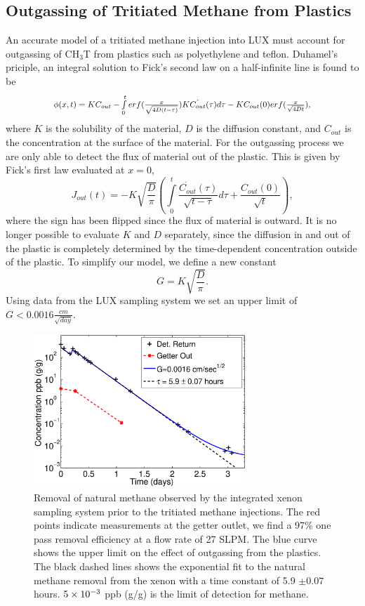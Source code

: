 \subsection{Outgassing of Tritiated Methane from Plastics}

\newcommand*{\Scale}[2][4]{\scalebox{#1}{$#2$}}%

An accurate model of a tritiated methane injection into LUX must account for outgassing of CH$_3$T from plastics such as polyethylene and teflon. Duhamel's priciple, an integral solution to Fick's second law on a half-infinite line is found to be
\[\Scale[0.85]{\phi (x,t) = KC_{out} - \int \limits_0^t erf(\frac{x}{\sqrt{4D(t - \tau)}})K\dot{C_{out}}(\tau)d\tau - KC_{out}(0)erf(\frac{x}{\sqrt{4Dt}}),}\]
where $K$ is the solubility of the material, $D$ is the diffusion constant, and $C_{out}$ is the concentration at the surface of the material. 
For the outgassing process we are only able to detect the flux of material out of the plastic.  This is given by Fick's first law evaluated at $x=0$,
\[J_{out}(t)= - K \sqrt{\frac{D}{\pi}}\left( \int \limits_0^t \frac{\dot{C_{out}}(\tau)}{\sqrt{t-\tau}} d \tau + \frac{C_{out}(0)}{\sqrt{t}}\right),\]
where the sign has been flipped since the flux of material is outward.  It is no longer possible to evaluate $K$ and $D$ separately, since the diffusion in and out of the plastic is completely determined by the time-dependent concentration outside of the plastic.  To simplify our model, we define a new constant
\[ G = K \sqrt{ \frac{D}{ \pi }} .\] Using data from the LUX sampling system we set an upper limit of $G<0.0016 \frac{cm}{\sqrt{day}}$. 

\begin{figure}[h!]\centering
\includegraphics[width=80mm]{July_CH4_wOG.eps}
\caption{Removal of natural methane observed by the integrated xenon sampling system prior to the tritiated methane injections. The red points indicate measurements at the getter outlet, we find a 97\% one pass removal efficiency at a flow rate of 27 SLPM. The blue curve shows the upper limit on the effect of outgassing from the plastics. The black dashed lines shows the exponential fit to the natural methane removal from the xenon with a time constant of 5.9 $\pm 0.07$ hours. $\rm 5\times10^{-3}$ ppb (g/g) is the limit of detection for methane.}
\label{fig:ch4_removal}
\end{figure}

